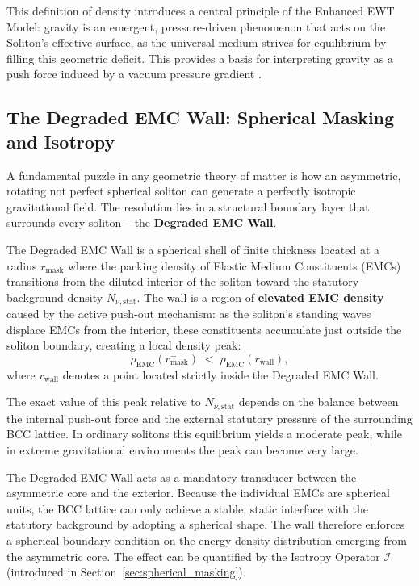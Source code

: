 \documentclass[10pt,a4paper]{article}
\begin{document}
This definition of density introduces a central principle of the Enhanced EWT Model: gravity is an emergent, pressure-driven phenomenon that acts on the Soliton's effective surface, as the universal medium strives for equilibrium by filling this geometric deficit. This provides a basis for interpreting gravity as a push force induced by a vacuum pressure gradient \cite{caligiuri2014gravity}.

\subsection{The Degraded EMC Wall: Spherical Masking and Isotropy}
\label{subsubsec:degraded_emc_wall}

A fundamental puzzle in any geometric theory of matter is how an asymmetric, rotating not perfect spherical soliton can generate a perfectly isotropic gravitational field. The resolution lies in a structural boundary layer that surrounds every soliton – the \textbf{Degraded EMC Wall}.

The Degraded EMC Wall is a spherical shell of finite thickness located at a radius \(r_{\text{mask}}\) where the packing density of Elastic Medium Constituents (EMCs) transitions from the diluted interior of the soliton toward the statutory background density \(N_{\nu,\text{stat}}\). The wall is a region of \textbf{elevated EMC density} caused by the active push-out mechanism: as the soliton's standing waves displace EMCs from the interior, these constituents accumulate just outside the soliton boundary, creating a local density peak:
\begin{equation}
	\rho_{\text{EMC}}(r_{\text{mask}}^-) \;<\; \rho_{\text{EMC}}(r_{\text{wall}}),
\end{equation}
where \(r_{\text{wall}}\) denotes a point located strictly inside the Degraded EMC Wall.

The exact value of this peak relative to \(N_{\nu,\text{stat}}\) depends on the balance between the internal push-out force and the external statutory pressure of the surrounding BCC lattice. In ordinary solitons this equilibrium yields a moderate peak, while in extreme gravitational environments the peak can become very large.

The Degraded EMC Wall acts as a mandatory transducer between the asymmetric core and the exterior. Because the individual EMCs are spherical units, the BCC lattice can only achieve a stable, static interface with the statutory background by adopting a spherical shape. The wall therefore enforces a spherical boundary condition on the energy density distribution emerging from the asymmetric core. The effect can be quantified by the Isotropy Operator \(\mathcal{I}\) (introduced in Section~\ref{sec:spherical_masking}).
\end{document}
